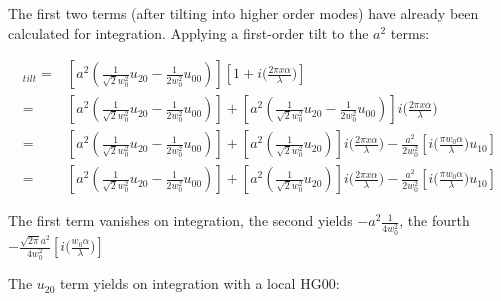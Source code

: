 \documentclass[aps,twoside,secnumarabic,balancelastpage,amsmath,amssymb,nofootinbib,hyperref=pdftex]{revtex4}
\newcommand{\bigfrac}[2]{\Big( \frac{#1}{#2}\Big)}
\begin{document}
The first two terms (after tilting into higher order modes) have already been calculated for integration. Applying a first-order tilt to the $a^2$ terms:



\begin{align*}
[a^2
		(
			\frac{1}{\sqrt{2}w_0^2} u_{20}
			-			
			\frac{1}{2w_0^2} u_{00}
		)
		]_{tilt}
		=&
		[a^2
		(
			\frac{1}{\sqrt{2}w_0^2} u_{20}
			-			
			\frac{1}{2w_0^2} u_{00}
		)
		]
		\left[
			1 + i \bigfrac{2 \pi x \alpha}{\lambda} \right]
			\\=&
		[a^2
		(
			\frac{1}{\sqrt{2}w_0^2} u_{20}
			-			
			\frac{1}{2w_0^2} u_{00}
		)
		]
		+
		[a^2
		(
			\frac{1}{\sqrt{2}w_0^2} u_{20}
			-			
			\frac{1}{2w_0^2} u_{00}
		)
		]	
		i \bigfrac{2 \pi x \alpha}{\lambda}
\\=&
		[a^2
		(
			\frac{1}{\sqrt{2}w_0^2} u_{20}
			-			
			\frac{1}{2w_0^2} u_{00}
		)
		]
		+
		[a^2
		(
			\frac{1}{\sqrt{2}w_0^2} u_{20}
		)
		]	
		i \bigfrac{2 \pi x \alpha}{\lambda}
		-
		\frac{ a^2}{2w_0^2}
		[i  \bigfrac{\pi w_{0} \alpha}{\lambda}u_{10}
		 ]	 
		 \\=&
		[a^2
		(
			\frac{1}{\sqrt{2}w_0^2} u_{20}
			-			
			\frac{1}{2 w_0^2} u_{00}
		)
		]
		+
		[a^2
		(
			\frac{1}{\sqrt{2}w_0^2} u_{20}
		)
		]	
		i \bigfrac{2 \pi x \alpha}{\lambda}
		-
		\frac{a^2}{2w_0^2}
		[i  \bigfrac{\pi w_{0} \alpha}{\lambda}u_{10}
		 ]	
\end{align*}

The first term vanishes on integration, the second yields $-a^2 \frac{1}{4 w_0^2}$, the fourth $-\frac{\sqrt{2 \pi} a^2}{4w_0^2}
		[i  \bigfrac{ w_{0} \alpha}{\lambda}
		 ]$

The $u_{20}$ term yields on integration with a local HG00:
\end{document}
